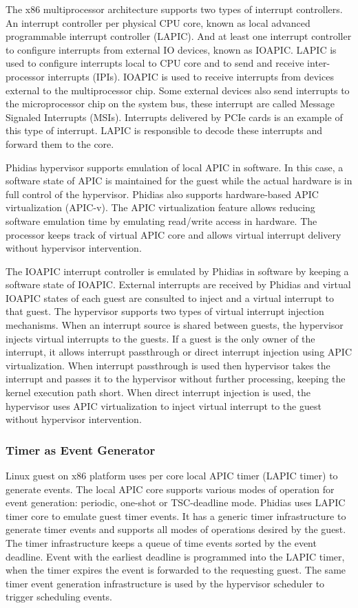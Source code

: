 The x86 multiprocessor architecture supports two types of interrupt controllers.
An interrupt controller per physical CPU core, known as local advanced programmable interrupt controller (LAPIC).
And at least one interrupt controller to configure interrupts from external IO devices, known as IOAPIC.
LAPIC is used to configure interrupts local to CPU core and to send and receive inter-processor interrupts (IPIs).
IOAPIC is used to receive interrupts from devices external to the multiprocessor chip.
Some external devices also send interrupts to the microprocessor chip on the system bus, these interrupt are called Message Signaled Interrupts (MSIs).
Interrupts delivered by PCIe cards is an example of this type of interrupt.
LAPIC is responsible to decode these interrupts and forward them to the core.

Phidias hypervisor supports emulation of local APIC in software. 
In this case, a software state of APIC is maintained for the guest while the actual hardware is in full control of the hypervisor.
Phidias also supports hardware-based APIC virtualization (APIC-v).
The APIC virtualization feature allows reducing software emulation time by emulating read/write access in hardware.
The processor keeps track of virtual APIC core and allows virtual interrupt delivery without hypervisor intervention.

The IOAPIC interrupt controller is emulated by Phidias in software by keeping a software state of IOAPIC. 
External interrupts are received by Phidias and virtual IOAPIC states of each guest are consulted to inject and a virtual interrupt to that guest.
The hypervisor supports two types of virtual interrupt injection mechanisms.
When an interrupt source is shared between guests, the hypervisor injects virtual interrupts to the guests.
If a guest is the only owner of the interrupt, it allows interrupt passthrough or direct interrupt injection using APIC virtualization.
When interrupt passthrough is used then hypervisor takes the interrupt and passes it to the hypervisor without further processing, keeping the kernel execution path short. 
When direct interrupt injection is used, the hypervisor uses APIC virtualization to inject virtual interrupt to the guest without hypervisor intervention.

\subsubsection{Timer as Event Generator}
Linux guest on x86 platform uses per core local APIC timer (LAPIC timer) to generate events. 
The local APIC core supports various modes of operation for event generation: periodic, one-shot or TSC-deadline mode. 
Phidias uses LAPIC timer core to emulate guest timer events.
It has a generic timer infrastructure to generate timer events and supports all modes of operations desired by the guest. 
The timer infrastructure keeps a queue of time events sorted by the event deadline.
Event with the earliest deadline is programmed into the LAPIC timer, when the timer expires the event is forwarded to the requesting guest.
The same timer event generation infrastructure is used by the hypervisor scheduler to trigger scheduling events.

